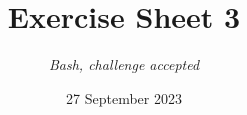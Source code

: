 




\title{{\vspace{-12mm}\huge\textbf{Exercise Sheet 3}}}
\author{\textit{Bash, challenge accepted}}
\date{{\small 27 September 2023}}


    \maketitle
    \bigskip
    
    \bigskip
    
    \bigskip
    
    \bigskip
    
    \bigskip
    
    \bigskip
    
